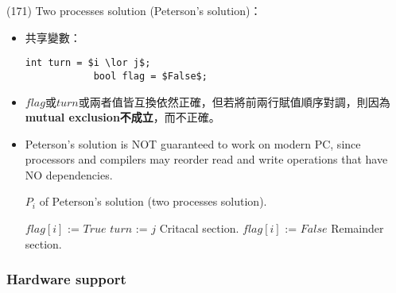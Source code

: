 \begin{theorem}{(171)} Two processes solution (Peterson's solution)：\begin{itemize}
        \item 共享變數：\begin{lstlisting}[caption={Shared variables of Peterson's solution (two processes solution).}, captionpos=b, mathescape=true]
            int turn = $i \lor j$;
            bool flag = $False$;
        \end{lstlisting}
        \item $flag$或$turn$或兩者值皆互換依然正確，但若將前兩行賦值順序對調，則因為\textbf{mutual exclusion不成立}，而不正確。
        \item Peterson's solution is NOT guaranteed to work on modern PC, since processors and compilers may reorder read and write operations that have NO dependencies.
        \begin{algorithm}[H]
            \caption{$P_i$ of Peterson's solution (two processes solution).}
            \begin{algorithmic}[1]
                    \Repeat 
                        \State $flag[i]$ := $True$
                        \State $turn$ := $j$
                        \EndWhile
                        \State Critacal section.
                        \State $flag[i]$ := $False$
                        \State Remainder section.
                \EndFunction
            \end{algorithmic}
        \end{algorithm}
    \end{itemize}
\end{theorem}

\subsubsection{Hardware support}

